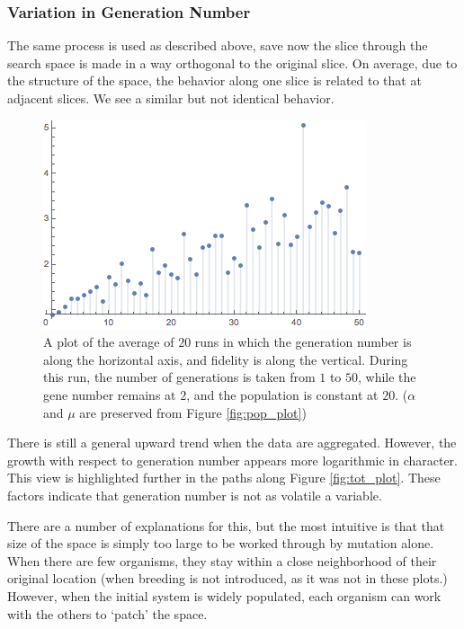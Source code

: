 \documentclass[11pt,twocolumn]{article}
\begin{document}

	\subsubsection{Variation in Generation Number}

	The same process is used as described above, save now the slice through the search space is made in a way orthogonal to the original slice. On average, due to the structure of the space, the behavior along one slice is related to that at adjacent slices. We see a similar but not identical behavior. 

	\begin{figure}[htpb]
		\centering
			\includegraphics[scale=0.6]{20O_Plot_2.png}
		\centering
		\caption{A plot of the average of $20$ runs in which the generation number is along the horizontal axis, and fidelity is along the vertical. During this run, the number of generations is taken from $1$ to $50$, while the gene number remains at $2$, and the population is constant at $20$. ($\alpha$ and $\mu$ are preserved from Figure \ref{fig:pop_plot})}
		\label{fig:gen_plot}
	\end{figure}

	There is still a general upward trend when the data are aggregated. However, the growth with respect to generation number appears more logarithmic in character. This view is highlighted further in the paths along Figure \ref{fig:tot_plot}. These factors indicate that generation number is not as volatile a variable. 

	There are a number of explanations for this, but the most intuitive is that that size of the space is simply too large to be worked through by mutation alone. When there are few organisms, they stay within a close neighborhood of their original location (when breeding is not introduced, as it was not in these plots.) However, when the initial system is widely populated, each organism can work with the others to `patch' the space. 
\end{document}
